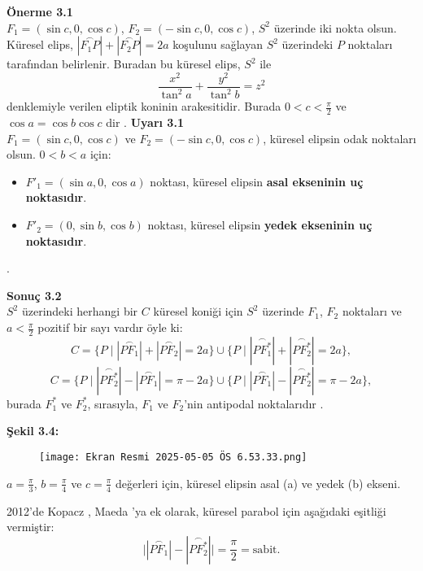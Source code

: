 
\textbf{Önerme 3.1} \\
$F_1 = (\sin c, 0, \cos c)$, $F_2 = (-\sin c, 0, \cos c)$, $S^2$ üzerinde iki nokta olsun. Küresel elips, $|\overset{\frown}{F_1P}| + |\overset{\frown}{F_2P}| = 2a$ koşulunu sağlayan $S^2$ üzerindeki $P$ noktaları tarafından belirlenir. Buradan bu küresel elips, $S^2$ ile
\[
\frac{x^2}{\tan^2 a} + \frac{y^2}{\tan^2 b} = z^2
\]
denklemiyle verilen eliptik koninin arakesitidir. Burada $0 < c < \frac{\pi}{2}$ ve $\cos a = \cos b \cos c$ dir   .
\textbf{Uyarı 3.1} \\
$F_1 = (\sin c, 0, \cos c)$ ve $F_2 = (-\sin c, 0, \cos c)$, küresel elipsin odak noktaları olsun. $0 < b < a$ için:
\begin{itemize}
    \item $F'_1 = (\sin a, 0, \cos a)$ noktası, küresel elipsin \textbf{asal ekseninin uç noktasıdır}.
    \item $F'_2 = (0, \sin b, \cos b)$ noktası, küresel elipsin \textbf{yedek ekseninin uç noktasıdır}.
\end{itemize}
  .

\textbf{Sonuç 3.2} \\
$S^2$ üzerindeki herhangi bir $C$ küresel koniği için $S^2$ üzerinde $F_1$, $F_2$ noktaları ve $a < \frac{\pi}{2}$ pozitif bir sayı vardır öyle ki:
\[
C = \{P \mid |\overset{\frown}{PF_1}| + |\overset{\frown}{PF_2}| = 2a\} \cup \{P \mid |\overset{\frown}{PF^*_1}| + |\overset{\frown}{PF^*_2}| = 2a\},
\]
\[
C = \{P \mid |\overset{\frown}{PF^*_2}| - |\overset{\frown}{PF_1}| = \pi - 2a\} \cup \{P \mid |\overset{\frown}{PF_1}| - |\overset{\frown}{PF^*_2}| = \pi - 2a\},
\]
burada $F^*_1$ ve $F^*_2$, sırasıyla, $F_1$ ve $F_2$'nin antipodal noktalarıdır   .

\textbf{Şekil 3.4:} 
\begin{figure}
    \centering
    \texttt{[image: Ekran Resmi 2025-05-05 ÖS 6.53.33.png]}
\end{figure}


$a = \frac{\pi}{3}$, $b = \frac{\pi}{4}$ ve $c = \frac{\pi}{4}$ değerleri için, küresel elipsin asal (a) ve yedek (b) ekseni.

2012'de Kopacz   , Maeda   'ya ek olarak, küresel parabol için aşağıdaki eşitliği vermiştir:
\[
\big||\overset{\frown}{PF_1}| - |\overset{\frown}{PF^*_2}|\big| = \frac{\pi}{2} = \text{sabit}.
\]

